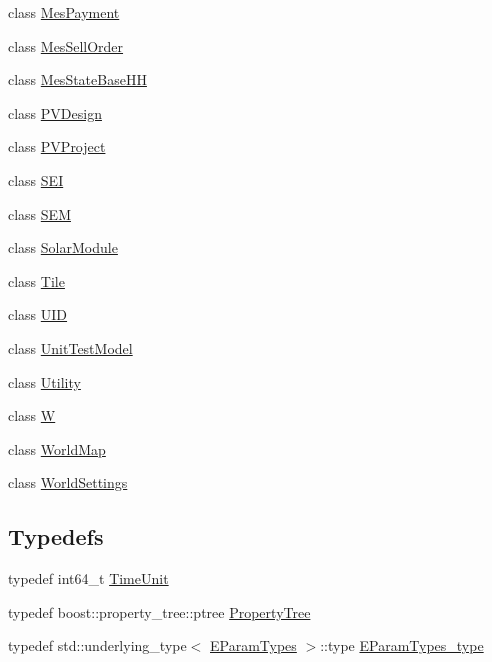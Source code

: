\begin{DoxyCompactItemize}
class \hyperlink{classsolar__core_1_1_mes_payment}{Mes\+Payment}
\item 
class \hyperlink{classsolar__core_1_1_mes_sell_order}{Mes\+Sell\+Order}
\item 
class \hyperlink{classsolar__core_1_1_mes_state_base_h_h}{Mes\+State\+Base\+H\+H}
\item 
class \hyperlink{classsolar__core_1_1_p_v_design}{P\+V\+Design}
\item 
class \hyperlink{classsolar__core_1_1_p_v_project}{P\+V\+Project}
\item 
class \hyperlink{classsolar__core_1_1_s_e_i}{S\+E\+I}
\item 
class \hyperlink{classsolar__core_1_1_s_e_m}{S\+E\+M}
\item 
class \hyperlink{classsolar__core_1_1_solar_module}{Solar\+Module}
\item 
class \hyperlink{classsolar__core_1_1_tile}{Tile}
\item 
class \hyperlink{classsolar__core_1_1_u_i_d}{U\+I\+D}
\item 
class \hyperlink{classsolar__core_1_1_unit_test_model}{Unit\+Test\+Model}
\item 
class \hyperlink{classsolar__core_1_1_utility}{Utility}
\item 
class \hyperlink{classsolar__core_1_1_w}{W}
\item 
class \hyperlink{classsolar__core_1_1_world_map}{World\+Map}
\item 
class \hyperlink{classsolar__core_1_1_world_settings}{World\+Settings}
\end{DoxyCompactItemize}
\subsection*{Typedefs}
\begin{DoxyCompactItemize}
\item 
typedef int64\+\_\+t \hyperlink{namespacesolar__core_a4b5949d07259da6f8a20d12a30403e90}{Time\+Unit}
\item 
typedef boost\+::property\+\_\+tree\+::ptree \hyperlink{namespacesolar__core_adeda2737d6938c190eb774a5b2495045}{Property\+Tree}
\item 
typedef std\+::underlying\+\_\+type$<$ \hyperlink{namespacesolar__core_aa1147341e5ef7a40d68d1bd68e149362}{E\+Param\+Types} $>$\+::type \hyperlink{namespacesolar__core_a256e8e2dc052f522b522d3f90b294caf}{E\+Param\+Types\+\_\+type}
\end{DoxyCompactItemize}
